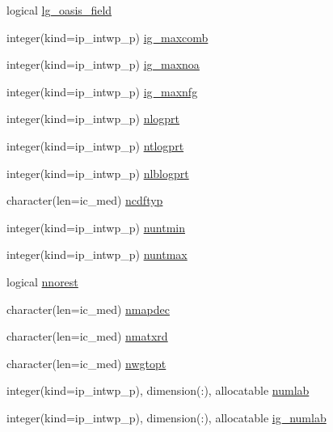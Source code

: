 \begin{DoxyCompactItemize}
\item 
logical \hyperlink{namespacemod__oasis__namcouple_aaf6b923ffc7763fd37a5c4c72bdfa34d}{lg\+\_\+oasis\+\_\+field}
\item 
integer(kind=ip\+\_\+intwp\+\_\+p) \hyperlink{namespacemod__oasis__namcouple_abba00866a740567bc1d93cf5850042fd}{ig\+\_\+maxcomb}
\item 
integer(kind=ip\+\_\+intwp\+\_\+p) \hyperlink{namespacemod__oasis__namcouple_ae66cf9f63b6c440406c9b675caef7759}{ig\+\_\+maxnoa}
\item 
integer(kind=ip\+\_\+intwp\+\_\+p) \hyperlink{namespacemod__oasis__namcouple_aab2d4bcc2dc767df51f99f907f4f3e6e}{ig\+\_\+maxnfg}
\item 
integer(kind=ip\+\_\+intwp\+\_\+p) \hyperlink{namespacemod__oasis__namcouple_a7b8c924fdea622759b99d8f61e03ade5}{nlogprt}
\item 
integer(kind=ip\+\_\+intwp\+\_\+p) \hyperlink{namespacemod__oasis__namcouple_a49bd874b06648257f7ce70da19a678b4}{ntlogprt}
\item 
integer(kind=ip\+\_\+intwp\+\_\+p) \hyperlink{namespacemod__oasis__namcouple_a13fcc269041aadb1f4dad9c46c1d76f8}{nlblogprt}
\item 
character(len=ic\+\_\+med) \hyperlink{namespacemod__oasis__namcouple_a7dec63f1624c3b60a8f45d8080919298}{ncdftyp}
\item 
integer(kind=ip\+\_\+intwp\+\_\+p) \hyperlink{namespacemod__oasis__namcouple_a9add83d816dc5cdb41c84747f4ee8962}{nuntmin}
\item 
integer(kind=ip\+\_\+intwp\+\_\+p) \hyperlink{namespacemod__oasis__namcouple_ab47490a015fa09cf75a760dadfeb0ff9}{nuntmax}
\item 
logical \hyperlink{namespacemod__oasis__namcouple_adb02545191d2ca9c1daff1a3ced2223f}{nnorest}
\item 
character(len=ic\+\_\+med) \hyperlink{namespacemod__oasis__namcouple_af56d31837b48a43e234bccbf1a3e2954}{nmapdec}
\item 
character(len=ic\+\_\+med) \hyperlink{namespacemod__oasis__namcouple_a7cb9d88a57224d84d97afc29b0e606bf}{nmatxrd}
\item 
character(len=ic\+\_\+med) \hyperlink{namespacemod__oasis__namcouple_ad7829e2434eb8214b599ba49395c9fc5}{nwgtopt}
\item 
integer(kind=ip\+\_\+intwp\+\_\+p), dimension(\+:), allocatable \hyperlink{namespacemod__oasis__namcouple_a12e1621f5697a0cdbde11d3e25f43b54}{numlab}
\item 
integer(kind=ip\+\_\+intwp\+\_\+p), dimension(\+:), allocatable \hyperlink{namespacemod__oasis__namcouple_ab0b9a7822ec44010e8652ed2d6abc0db}{ig\+\_\+numlab}

\end{DoxyCompactItemize}
